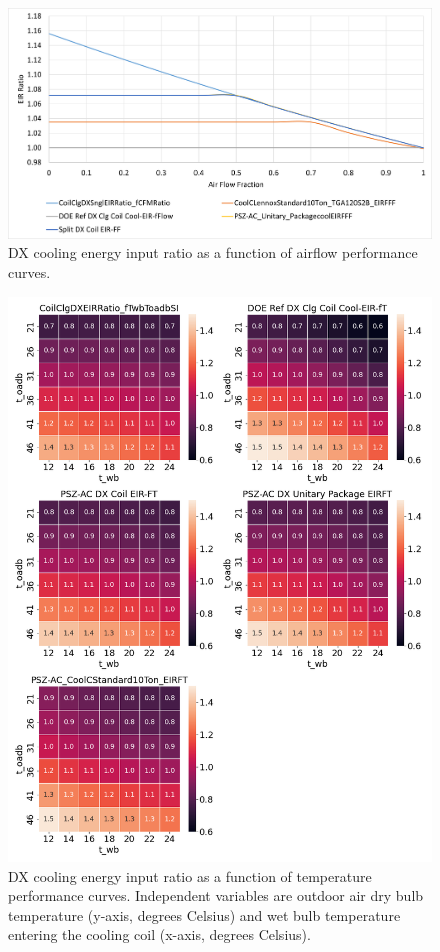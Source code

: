 \begin{figure}
    \centering \includegraphics[width=1.0\textwidth]{figures/EIRFF.png}
    \caption[DX cooling energy input ratio as a function of airflow performance curves]{DX cooling energy input ratio as a function of airflow performance curves.}
    \label{fig:dx_eirff}
\end{figure}

\begin{figure}
    \centering \includegraphics[width=1.0\textwidth]{figures/EIRFT.png}
    \caption[DX cooling energy input ratio as a function of temperature performance curves]{DX cooling energy input ratio as a function of temperature performance curves. Independent variables are outdoor air dry bulb temperature (y-axis, degrees Celsius) and wet bulb temperature entering the cooling coil (x-axis, degrees Celsius).}
    \label{fig:dx_eirft}
\end{figure}

